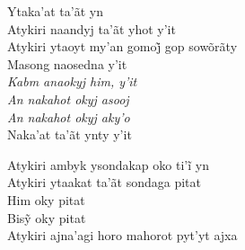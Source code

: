 \bigskip

\begin{linenumbers}\begingroup\raggedright
 
\noindent   Ytaka'at ta'ãt yn\\
  Atykiri naandyj ta'ãt yhot y'it\\
  Atykiri ytaoyt my’an gomoj̃ gop sowõrãty\\
  Masong naosedna y'it\\
  \emph{Kabm anaokyj him, y'it}\\
  \emph{An nakahot okyj asooj}\\
  \emph{An nakahot okyj aky'o}\\
  Naka'at ta'ãt ynty y'it
 
\end{linenumbers}\endgroup

\bigskip

\begin{linenumbers}\begingroup\raggedright
 
\noindent   Atykiri ambyk ysondakap oko ti’ĩ yn\\
  Atykiri ytaakat ta'ãt sondaga pitat\\
  Him oky pitat\\
  Bisỹ oky pitat\\
  Atykiri ajna'agi horo mahorot pyt'yt ajxa
 
\end{linenumbers}\endgroup

\bigskip

